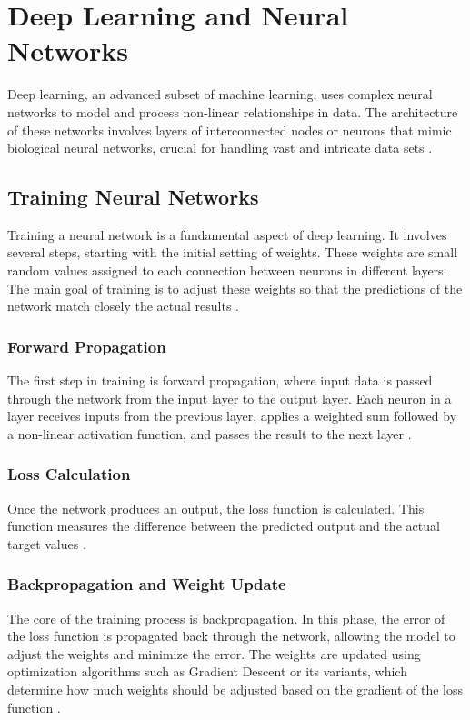 \section{Deep Learning and Neural Networks}
\label{sec:deep_learning}
Deep learning, an advanced subset of machine learning, uses complex neural networks to model and process non-linear relationships in data. The architecture of these networks involves layers of interconnected nodes or neurons that mimic biological neural networks, crucial for handling vast and intricate data sets \cite{goodfellow2016deep, pak2017review}.

\subsection{Training Neural Networks}
Training a neural network is a fundamental aspect of deep learning. It involves several steps, starting with the initial setting of weights. These weights are small random values assigned to each connection between neurons in different layers. The main goal of training is to adjust these weights so that the predictions of the network match closely the actual results \cite{goodfellow2016deep}.

\subsubsection{Forward Propagation}
The first step in training is forward propagation, where input data is passed through the network from the input layer to the output layer. Each neuron in a layer receives inputs from the previous layer, applies a weighted sum followed by a non-linear activation function, and passes the result to the next layer \cite{torresen1997convergence}.

\subsubsection{Loss Calculation}
Once the network produces an output, the loss function is calculated. This function measures the difference between the predicted output and the actual target values \cite{Wang2020ComprehensiveSF}.

\subsubsection{Backpropagation and Weight Update}
The core of the training process is backpropagation. In this phase, the error of the loss function is propagated back through the network, allowing the model to adjust the weights and minimize the error. The weights are updated using optimization algorithms such as Gradient Descent or its variants, which determine how much weights should be adjusted based on the gradient of the loss function \cite{torresen1997convergence}.

